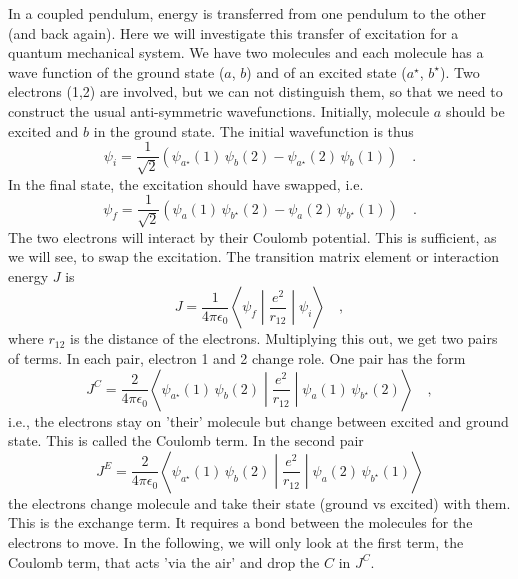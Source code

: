 In a coupled pendulum, energy is transferred from one pendulum to the other (and back again). Here we will investigate this transfer of excitation for a quantum mechanical system. We have two molecules and each molecule has a wave function of the ground state ($a$, $b$) and of an excited state ($a^\star$, $b^\star$). Two electrons (1,2) are involved, but we can not distinguish them, so that we need to construct the usual anti-symmetric wavefunctions. Initially, molecule $a$ should be excited and $b$ in the ground state. The initial wavefunction is thus
\begin{equation}
   \psi_i = \frac{1}{\sqrt{2}} \left( \psi_{a^\star}(1) \,  \psi_{b}(2) -   \psi_{a^\star}(2) \,  \psi_{b}(1)\right)  \quad .
\end{equation}
In the final state, the excitation should have swapped, i.e.
\begin{equation}
   \psi_f = \frac{1}{\sqrt{2}} \left( \psi_{a}(1) \,  \psi_{b^\star}(2) -   \psi_{a}(2) \,  \psi_{b^\star}(1)\right)  \quad .
\end{equation}
The two electrons will interact by their Coulomb potential. This is sufficient, as we will see, to swap the excitation. The transition matrix element or interaction energy $J$ is
\begin{equation}
   J = \frac{1}{4 \pi \epsilon_0} \left\langle \psi_f \middle| \frac{e^2}{r_{12}} \middle| \psi_i \right\rangle \quad ,
\end{equation}
where $r_{12}$ is the distance of the electrons. Multiplying this out, we get two pairs of terms. In each pair, electron 1 and 2 change role. One pair has the form
\begin{equation}
   J^C = \frac{2}{4 \pi \epsilon_0}  \left\langle  \psi_{a^\star}(1) \,  \psi_{b}(2)\middle| \frac{e^2}{r_{12}} \middle|  \psi_{a}(1) \,  \psi_{b^\star}(2)\right\rangle \quad ,
\end{equation} 
i.e., the electrons stay on 'their' molecule but change between excited and ground state. This is called the Coulomb term. In the second pair
\begin{equation}
   J^E = \frac{2}{4 \pi \epsilon_0}  \left\langle \psi_{a^\star}(1) \,  \psi_{b}(2) \middle| \frac{e^2}{r_{12}} \middle|  \psi_{a}(2) \,  \psi_{b^\star}(1) \right\rangle
\end{equation} 
%
the electrons change molecule and take their state (ground vs excited) with them. This is the exchange term. It requires a bond between the molecules for the electrons to move. In the following, we will only look at the first term, the Coulomb term, that acts 'via the air' and drop the $C$ in $J^C$.





